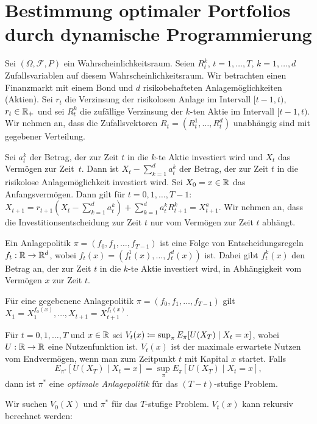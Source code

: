 \documentclass[a4paper,twoside,DIV15,BCOR12mm]{scrbook}
\newcommand{\cF}{\mathcal F}
\begin{document}
\section{Bestimmung optimaler Portfolios durch dynamische Programmierung}

Sei $(\Omega,\cF,P)$ ein Wahrscheinlichkeitsraum. Seien $R_t^k$, $t=1,\ldots, T$, $k=1,\ldots,d$ Zufallsvariablen auf diesem Wahrscheinlichkeitsraum. Wir betrachten einen Finanzmarkt mit einem Bond und $d$ risikobehafteten Anlagemöglichkeiten (Aktien). Sei $r_t$ die Verzinsung der risikolosen Anlage im Intervall $[t-1,t)$, $r_t\in \mathbb{R}_+$ und sei $R_t^k$ die zufällige Verzinsung der $k$-ten Aktie im Intervall $[t-1,t)$. Wir nehmen an, dass die Zufallsvektoren $R_t=(R_t^1,\ldots,R_t^d)$ unabhängig sind mit gegebener Verteilung.

Sei $a_t^k$ der Betrag, der zur Zeit $t$ in die $k$-te Aktie investiert wird und $X_t$ das Vermögen zur Zeit~$t$. Dann ist $X_t - \sum_{k=1}^d a_t^k$ der Betrag, der zur Zeit $t$ in die risikolose Anlagemöglichkeit investiert wird. Sei $X_0=x \in \mathbb{R}$ das Anfangsvermögen. Dann gilt für $t=0,1,\ldots, T-1$: $X_{t+1} = r_{t+1}(X_t - \sum_{k=1}^d a_t^k) + \sum_{k=1}^d a_t^k R_{t+1}^k = X_{t+1}^a$.
Wir nehmen an, dass die Investitionsentscheidung zur Zeit $t$ nur vom Vermögen zur Zeit $t$ abhängt.

\begin{definition}
Ein Anlagepolitik $\pi = (f_0,f_1,\ldots,f_{T-1})$ ist eine Folge von Entscheidungsregeln $f_t:\mathbb{R}\to\mathbb{R}^d$, wobei $f_t(x) =(f_t^1(x),\ldots,f_t^d(x))$ ist. Dabei gibt $f_t^k(x)$ den Betrag an, der zur Zeit $t$ in die $k$-te Aktie investiert wird, in Abhängigkeit vom Vermögen $x$ zur Zeit $t$.

Für eine gegebenene Anlagepolitik $\pi=(f_0,f_1,\ldots,f_{T-1})$ gilt $X_1 = X_1^{f_0(x)},\ldots, X_{t+1} =X_{t+1}^{f_t(x)}$.
\end{definition}

\begin{definition}
Für $t=0,1,\ldots,T$ und $x\in\mathbb{R}$ sei $V_t(x) \da \sup_\pi E_\pi[U(X_T)\mid X_t=x]$, wobei $U:\mathbb{R}\to\mathbb{R}$ eine Nutzenfunktion ist. $V_t(x)$ ist der maximale erwartete Nutzen vom Endvermögen, wenn man zum Zeitpunkt $t$ mit Kapital $x$ startet. Falls
\[
E_{\pi^*}[U(X_T)\mid X_t=x] 
= \sup_{\pi} E_\pi[U(X_T)\mid X_t=x],
\]
dann ist $\pi^*$ eine \emph{optimale Anlagepolitik} für das $(T-t)$-stufige Problem.
\end{definition}

Wir suchen $V_0(X)$ und $\pi^*$ für das $T$-stufige Problem.
$V_t(x)$ kann rekursiv berechnet werden:
\end{document}
